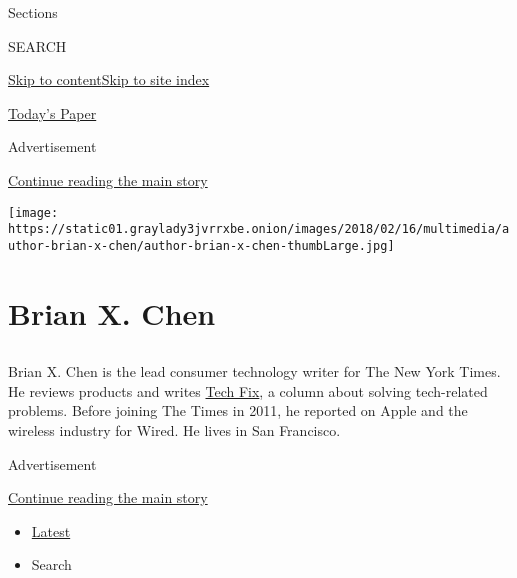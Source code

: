 Sections

SEARCH

\protect\hyperlink{site-content}{Skip to
content}\protect\hyperlink{site-index}{Skip to site index}

\href{https://myaccount.nytimes3xbfgragh.onion/auth/login?response_type=cookie\&client_id=vi}{}

\href{https://www.nytimes3xbfgragh.onion/section/todayspaper}{Today's
Paper}

Advertisement

\protect\hyperlink{after-top}{Continue reading the main story}

\texttt{[image: https://static01.graylady3jvrrxbe.onion/images/2018/02/16/multimedia/author-brian-x-chen/author-brian-x-chen-thumbLarge.jpg]}

\hypertarget{brian-x-chen}{%
\section{Brian X. Chen}\label{brian-x-chen}}

\subsection{}

Brian X. Chen is the lead consumer technology writer for The New York
Times. He reviews products and writes
\href{http://www.nytimes3xbfgragh.onion/column/tech-fix}{Tech Fix}, a
column about solving tech-related problems. Before joining The Times in
2011, he reported on Apple and the wireless industry for Wired. He lives
in San Francisco.

Advertisement

\protect\hyperlink{after-mid1}{Continue reading the main story}

\begin{itemize}
\tightlist
\item
  \protect\hyperlink{stream-panel}{Latest}
\item
  Search
\end{itemize}

